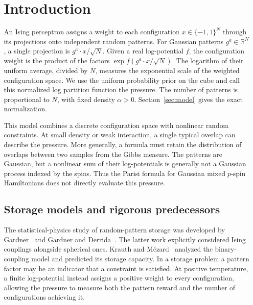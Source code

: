 \section{Introduction}\label{sec:introduction}

An Ising perceptron assigns a weight to each configuration
$x\in\{-1,1\}^N$ through its projections onto independent random patterns.
For Gaussian patterns $g^a\in\mathbb R^N$, a single projection is
$g^a\cdot x/\sqrt N$. Given a real log-potential $f$, the configuration
weight is the product of the factors $\exp f(g^a\cdot x/\sqrt N)$.
The logarithm of their uniform average, divided by $N$, measures the exponential scale
of the weighted configuration space. We use the uniform probability prior
on the cube and call this normalized log partition function the pressure.
The number of patterns is proportional to $N$, with fixed density
$\alpha>0$. Section~\ref{sec:model} gives the exact normalization.

This model combines a discrete configuration space with nonlinear random
constraints. At small density or weak interaction, a single typical overlap
can describe the pressure. More generally, a formula must retain the
distribution of overlaps between two samples from the Gibbs measure. The
patterns are Gaussian, but a nonlinear sum of their log-potentials is
generally not a Gaussian process indexed by the spins. Thus the Parisi
formula for Gaussian mixed $p$-spin Hamiltonians does not directly evaluate
this pressure.

\subsection{Storage models and rigorous predecessors}

The statistical-physics study of random-pattern storage was developed by
Gardner~\cite{gardner1988} and Gardner and Derrida~\cite{gardnerderrida1988}.
The latter work explicitly considered Ising couplings alongside spherical
ones. Krauth and M\'ezard~\cite{krauthmezard1989} analyzed the binary-coupling
model and predicted its storage capacity. In a storage problem a pattern
factor may be an indicator that a constraint is satisfied. At positive
temperature, a finite log-potential instead assigns a positive weight to
every configuration, allowing the pressure to measure both the pattern
reward and the number of configurations achieving it.

